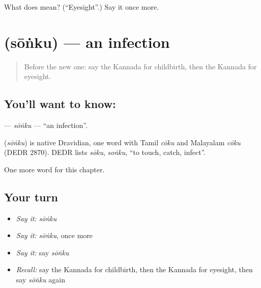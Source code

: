 \begin{tcolorbox}[breakable,colback=teal!4,colframe=teal!35!black,title={Before you move on}]
What does  mean? (\textquotedblleft{}Eyesight\textquotedblright{}.) Say it once more.
\end{tcolorbox}
\section[\texorpdfstring{\kn{ಸೋಂಕು} (sōṅku)}{ಸೋಂಕು (sōṅku)}]{ (sōṅku) — an infection}

\label{lesson:KA-C170-sonku}



\begin{quote}
Before the new one: say the Kannada for childbirth, then the Kannada for eyesight.
\end{quote}

\subsection*{You'll want to know: }
\textbf{} — \emph{sōṅku} — \textquotedblleft{}an infection\textquotedblright{}.

\begin{cousinweb}
\textbf{} (\emph{sōṅku}) is native Dravidian, one word with Tamil \emph{cōku} and Malayalam \emph{cōku} (DEDR 2870). DEDR lists \emph{sōku}, \emph{soṅku}, \textquotedblleft{}to touch, catch, infect\textquotedblright{}.
\end{cousinweb}

\begin{grammarlens}[title={What you've built}]
One more word for this chapter.
\end{grammarlens}

\subsection*{Your turn}
\begin{itemize}
\raggedright
  \item \emph{Say it:} \emph{sōṅku}
  \item \emph{Say it:} \emph{sōṅku}, once more
  \item \emph{Say it:} say \emph{sōṅku}
  \item \emph{Recall:} say the Kannada for childbirth, then the Kannada for eyesight, then say \emph{sōṅku} again
\end{itemize}

